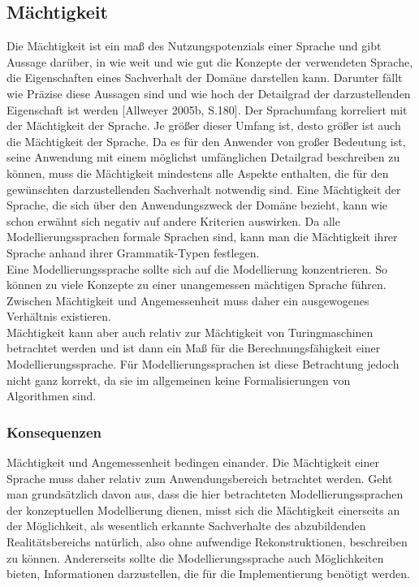 \subsection{Mächtigkeit}
\label{ssc:Nutzungspotenzial}
Die Mächtigkeit ist ein maß des Nutzungspotenzials einer Sprache und gibt Aussage darüber,
in wie weit und wie gut die Konzepte der verwendeten Sprache, die Eigenschaften eines Sachverhalt der Domäne darstellen kann.
Darunter fällt wie Präzise diese Aussagen sind und wie hoch der Detailgrad der darzustellenden Eigenschaft ist werden [Allweyer 2005b, S.180].
Der Sprachumfang korreliert mit der Mächtigkeit der Sprache. Je größer dieser Umfang ist, desto größer ist auch die Mächtigkeit der Sprache.
Da es für den Anwender von großer Bedeutung ist, seine Anwendung mit einem möglichst umfänglichen Detailgrad beschreiben zu können,
muss die Mächtigkeit mindestens alle Aspekte enthalten, die für den gewünschten darzustellenden Sachverhalt notwendig sind.
Eine Mächtigkeit der Sprache, die sich über den Anwendungszweck der Domäne bezieht, kann wie schon erwähnt sich negativ auf andere Kriterien auswirken.
Da alle Modellierungssprachen formale Sprachen sind, kann man die Mächtigkeit ihrer Sprache anhand ihrer Grammatik-Typen festlegen. \\
Eine Modellierungssprache sollte sich auf die Modellierung konzentrieren.
So können zu viele Konzepte zu einer unangemessen mächtigen Sprache führen. Zwischen Mächtigkeit
und Angemessenheit muss daher ein ausgewogenes Verhältnis existieren.\\
Mächtigkeit kann aber auch relativ zur Mächtigkeit von Turingmaschinen betrachtet werden und ist
dann ein Maß für die Berechnungsfähigkeit einer Modellierungssprache. Für Modellierungssprachen
ist diese Betrachtung jedoch nicht ganz korrekt, da sie im allgemeinen keine Formalisierungen von
Algorithmen sind.
\subsubsection{Konsequenzen}
Mächtigkeit und Angemessenheit bedingen einander. Die Mächtigkeit einer Sprache muss daher relativ
zum Anwendungsbereich betrachtet werden. Geht man grundsätzlich davon aus, dass die hier betrachteten
Modellierungssprachen der konzeptuellen Modellierung dienen, misst sich die Mächtigkeit einerseits
an der Möglichkeit, als wesentlich erkannte Sachverhalte des abzubildenden Realitätsbereichs
natürlich, also ohne aufwendige Rekonstruktionen, beschreiben zu können. Andererseits sollte die
Modellierungssprache auch Möglichkeiten bieten, Informationen darzustellen, die für die Implementierung
benötigt werden.

